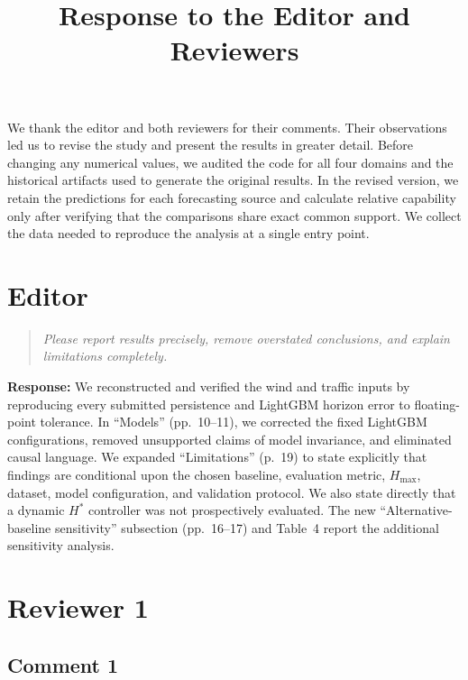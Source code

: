 \documentclass[11pt,a4paper]{article}
\title{\textbf{Response to the Editor and Reviewers}}
\author{}
\date{}
\newenvironment{reviewcomment}
  {\begin{quote}\itshape}
  {\end{quote}}
\newcommand{\response}{\noindent\textbf{Response:} }
\begin{document}
\maketitle
We thank the editor and both reviewers for their comments. Their observations led us to revise the study and present the results in greater detail. Before changing any numerical values, we audited the code for all four domains and the historical artifacts used to generate the original results. In the revised version, we retain the predictions for each forecasting source and calculate relative capability only after verifying that the comparisons share exact common support. We collect the data needed to reproduce the analysis at a single entry point.


\section*{Editor}

\begin{reviewcomment}
Please report results precisely, remove overstated conclusions, and explain
limitations completely.
\end{reviewcomment}

\response
We reconstructed and verified the wind and traffic inputs by reproducing every
submitted persistence and LightGBM horizon error to floating-point tolerance.
In ``Models'' (pp.~10--11), we corrected the fixed LightGBM configurations,
removed unsupported claims of model invariance, and eliminated causal language.
We expanded ``Limitations'' (p.~19) to state explicitly that findings are
conditional upon the chosen baseline, evaluation metric, $H_{\max}$, dataset,
model configuration, and validation protocol. We also state directly that a
dynamic $H^*$ controller was not prospectively evaluated. The new
``Alternative-baseline sensitivity'' subsection (pp.~16--17) and Table~4 report
the additional sensitivity analysis.


\section*{Reviewer 1}

\subsection*{Comment 1}
\end{document}
